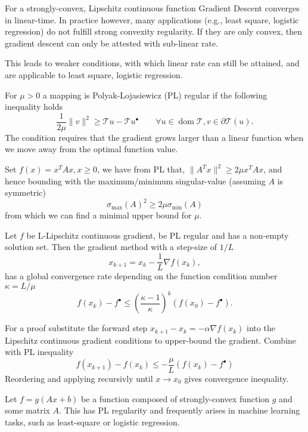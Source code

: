 \documentclass[varwidth=15cm, border=.5cm]{standalone}
\DeclareMathOperator{\domain}{dom}
\newcommand{\optimal}[1]{{#1^{\scriptscriptstyle\bullet}}}
\begin{document}
\begin{definition}[label=3rjrllrr, name=Strong Convexity Regularity]
	\begin{remark}[label=4nciih04, name=Strong Convexity in Practice]
		For a strongly-convex, Lipschitz continuous function Gradient
		Descent converges in linear-time. In practice however, many
		applications (e.g., least square, logistic regression) do not
		fulfill strong convexity regularity. If they are only convex,
		then gradient descent can only be attested with sub-linear
		rate.

		This leads to weaker conditions, with which linear rate can
		still be attained, and are applicable to least square, logistic
		regression.
	\end{remark}
\end{definition}

\begin{definition}[label=xt9s0uma, name=Polyak-Lojasiewicz Regularity]
	For \(\mu > 0\) a mapping is Polyak-Lojasiewicz (PL) regular if the following 
	inequality holds
	\[
		\frac{1}{2\mu}\lVert v\rVert^2 \geq \mathcal T u - \mathcal T\optimal{u} \qquad \forall u\in\domain{\mathcal T}, v \in \partial\mathcal T(u).
	\]
	The condition requires that the gradient grows larger than a linear
	function when we move away from the optimal function value. 

	\begin{example}[label=ckhagcj4, name=Example for a quadratic function]
		Set \(f(x) = x^TAx, x\geq0\), we have from PL that,
		\(\lVert A^Tx\rVert^2 \geq 2\mu x^TAx\), and hence bounding with
		the maximum/minimum singular-value (assuming \(A\) is symmetric)
		\[
			\sigma_\text{max}(A)^2 \geq 2\mu\sigma_\text{min}(A)
		\]
		from which we can find a minimal upper bound for \(\mu\).
	\end{example}

	\begin{theorem}[label=zs9zsqoh, name=Convergence of Gradient Descent]
		Let \(f\) be L-Lipschitz continuous gradient, be PL regular and
		has a non-empty solution set. Then the gradient method with a
		step-size of \(1/L\)
		\[
			x_{k+1}=x_k-\frac{1}{L}\nabla f(x_k),
		\]
		has a global convergence rate depending on the function condition
		number \(\kappa = L/\mu\)
		\[
			f(x_k) - \optimal{f}\leq\left(\frac{\kappa-1}{\kappa}\right)^k(f(x_0) - \optimal{f}).
		\]

		For a proof substitute the forward step
		\(x_{k+1}-x_k=-\alpha\nabla f(x_k)\) into the Lipschitz
		continuous gradient conditions to upper-bound the gradient.
		Combine with PL inequality
		\[
			f(x_{k+1})-f(x_k) \leq -\frac{\mu}{L}(f(x_k) - \optimal{f})
		\]
		Reordering and applying recursivly until \(x\to x_0\) gives
		convergence inequality.
	\end{theorem}
	\begin{example}[label=jab2zae3, name=Strongly-convex composed with linear]
		Let \(f = g(Ax + b)\) be a function composed of strongly-convex 
		function \(g\) and some matrix \(A\). This has PL regularity and
		frequently arises in machine learning tasks, such as
		least-square or logistic regression.
	\end{example}
\end{definition}
\end{document}
